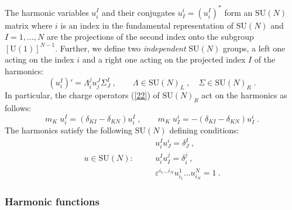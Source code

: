 \documentclass[a4paper,12pt]{article}
\begin{document}
The harmonic variables $u^I_i$ and their conjugates $u^i_I = 
(u^I_i)^* $  form an $\mbox{SU}(N)$ matrix where $i$ is an index 
in the fundamental representation of $\mbox{SU}(N)$ and 
$I=1,\ldots,N$ are the projections of the second index onto the 
subgroup $[\mbox{U}(1)]^{N-1}$. Further, we define two {\sl 
independent} $\mbox{SU}(N)$ groups, a left one acting on the index 
$i$ and a right one acting on the projected index $I$ of the 
harmonics: 
\begin{equation}\label{3.0}
 (u^I_i)'= \Lambda_i^ju_j^J\Sigma_J^I\;, \qquad \Lambda\in\mbox{SU}(N)_L\;, \quad
\Sigma\in\mbox{SU}(N)_R\;. 
\end{equation}
In particular, the charge operators (\ref{22}) of $\mbox{SU}(N)_R$ 
act on the harmonics as follows: 
\begin{equation}\label{3.1}
m_K\; u^I_i = (\delta_{KI}-\delta_{KN}) u^I_i\;, \qquad m_K\;  
u^i_I = - (\delta_{KI}-\delta_{KN})  u^i_I\;.  
\end{equation}
The harmonics satisfy the following $\mbox{SU}(N)$ defining 
conditions: 
\begin{eqnarray}
 &&u^I_i u^i_J=\delta^I_J~, \nonumber\\ u\in 
\mbox{SU}(N):\quad &&u^I_i u^j_I =\delta^j_i~,\label{3.2}\\ && 
\varepsilon^{i_1\ldots i_N}u^1_{i_1}\ldots u^N_{i_N}=1~. \nonumber 
\end{eqnarray}

\subsubsection{Harmonic functions}
  
\end{document}
